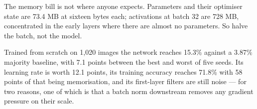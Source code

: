 \documentclass[11pt,a4paper]{article}
\begin{document}
The memory bill is not where anyone expects. Parameters and their optimiser
state are 73.4 MB at sixteen bytes each; activations at batch 32 are 728 MB,
concentrated in the early layers where there are almost no parameters. So halve
the batch, not the model.

Trained from scratch on 1{,}020 images the network reaches 15.3\% against a
3.87\% majority baseline, with 7.1 points between the best and worst of five
seeds. Its learning rate is worth 12.1 points, its training accuracy reaches
71.8\% with 58 points of that being memorisation, and its first-layer filters
are still noise --- for two reasons, one of which is that a batch norm
downstream removes any gradient pressure on their scale.
\end{document}
